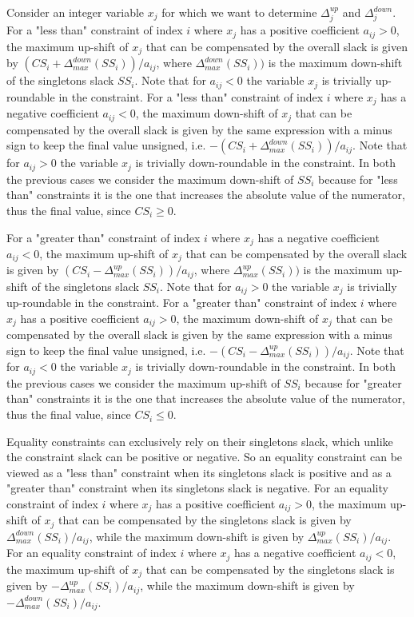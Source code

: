 \documentclass[a4paper,12pt,twoside]{scrbook}
\begin{document}
Consider an integer variable $x_j$ for which we want to determine $\Delta_{j}^{up}$ and $\Delta_{j}^{down}$.
For a "less than" constraint of index $i$ where $x_j$ has a positive coefficient $a_{ij} > 0$, the maximum up-shift of $x_j$ that can be compensated by the overall slack is given by $(CS_i + \Delta_{max}^{down}(SS_i)) / a_{ij}$, where $\Delta_{max}^{down}(SS_i))$ is the maximum down-shift of the singletons slack $SS_i$. Note that for $a_{ij} < 0$ the variable $x_j$ is trivially up-roundable in the constraint.
For a "less than" constraint of index $i$ where $x_j$ has a negative coefficient $a_{ij} < 0$, the maximum down-shift of $x_j$ that can be compensated by the overall slack is given by the same expression with a minus sign to keep the final value unsigned, i.e. $-(CS_i + \Delta_{max}^{down}(SS_i)) / a_{ij}$. Note that for $a_{ij} > 0$ the variable $x_j$ is trivially down-roundable in the constraint. In both the previous cases we consider the maximum down-shift of $SS_i$ because for "less than" constraints it is the one that increases the absolute value of the numerator, thus the final value, since $CS_i \geq 0$. \par 
For a "greater than" constraint of index $i$ where $x_j$ has a negative coefficient $a_{ij} < 0$, the maximum up-shift of $x_j$ that can be compensated by the overall slack is given by $(CS_i - \Delta_{max}^{up}(SS_i)) / a_{ij}$, where $\Delta_{max}^{up}(SS_i))$ is the maximum up-shift of the singletons slack $SS_i$. Note that for $a_{ij} > 0$ the variable $x_j$ is trivially up-roundable in the constraint.
For a "greater than" constraint  of index $i$ where $x_j$ has a positive coefficient $a_{ij} > 0$, the maximum down-shift of $x_j$ that can be compensated by the overall slack is given by the same expression with a minus sign to keep the final value unsigned, i.e. $-(CS_i - \Delta_{max}^{up}(SS_i)) / a_{ij}$. Note that for $a_{ij} < 0$ the variable $x_j$ is trivially down-roundable in the constraint. In both the previous cases we consider the maximum up-shift of $SS_i$ because for "greater than" constraints it is the one that increases the absolute value of the numerator, thus the final value, since $CS_i \leq 0$. \par
Equality constraints can exclusively rely on their singletons slack, which unlike the constraint slack can be positive or negative. So an equality constraint can be viewed as a "less than" constraint when its singletons slack is positive and as a "greater than" constraint when its singletons slack is negative. For an equality constraint of index $i$ where $x_j$ has a positive coefficient $a_{ij} > 0$, the maximum up-shift of $x_j$ that can be compensated by the singletons slack is given by $\Delta_{max}^{down}(SS_i) / a_{ij}$, while the maximum down-shift is given by $\Delta_{max}^{up}(SS_i) / a_{ij}$. For an equality constraint of index $i$ where $x_j$ has a negative coefficient $a_{ij} < 0$, the maximum up-shift of $x_j$ that can be compensated by the singletons slack is given by $-\Delta_{max}^{up}(SS_i) / a_{ij}$, while the maximum down-shift is given by $-\Delta_{max}^{down}(SS_i) / a_{ij}$. \par 
\end{document}

